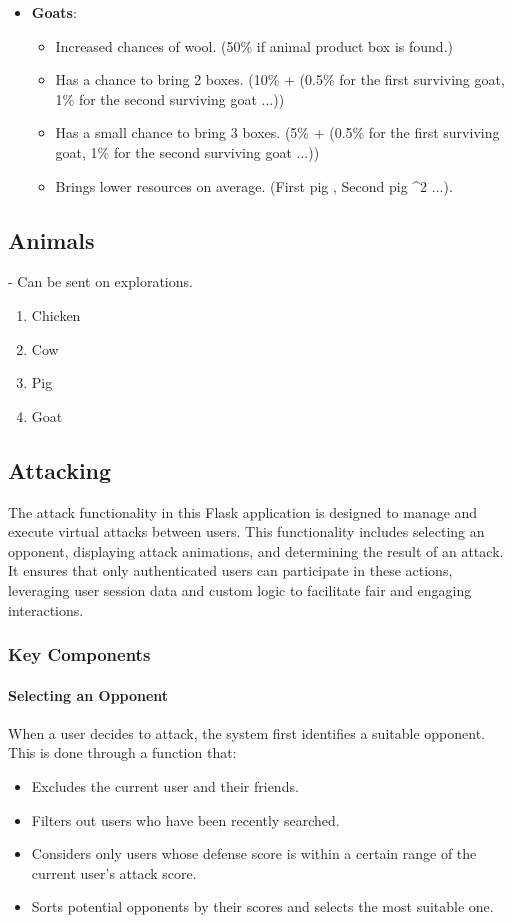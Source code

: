 \documentclass[12pt]{article}
\begin{document}
\begin{itemize}
\item \textbf{Goats}:
\begin{itemize}
    \item Increased chances of wool.
    (50\% if animal product box is found.)
    \item Has a chance to bring 2 boxes.
    (10\% + (0.5\% for the first surviving goat, 1\% for the second surviving goat ...))
    \item Has a small chance to bring 3 boxes.
    (5\% + (0.5\% for the first surviving goat, 1\% for the second surviving goat ...))
    \item Brings lower resources on average.
    (First pig , Second pig ^2 ...).
\end{itemize}
\end{itemize}


\subsection{Animals}
- Can be sent on explorations.
\begin{enumerate}
    \item Chicken
    \item Cow
    \item Pig
    \item Goat
\end{enumerate}

\subsection{Attacking}

The attack functionality in this Flask application is designed to manage and execute virtual attacks between users. This functionality includes selecting an opponent, displaying attack animations, and determining the result of an attack. It ensures that only authenticated users can participate in these actions, leveraging user session data and custom logic to facilitate fair and engaging interactions.

\subsubsection{Key Components}

\paragraph{Selecting an Opponent}
When a user decides to attack, the system first identifies a suitable opponent. This is done through a function that:
\begin{itemize}
    \item Excludes the current user and their friends.
    \item Filters out users who have been recently searched.
    \item Considers only users whose defense score is within a certain range of the current user's attack score.
    \item Sorts potential opponents by their scores and selects the most suitable one.
\end{itemize}
\end{document}

